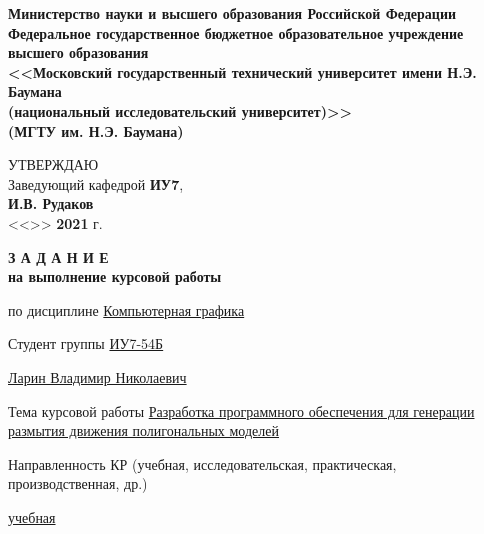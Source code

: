 \thispagestyle{empty}
\begin{center}
    \fontsize{11pt}{0.3\baselineskip}\selectfont \textbf{Министерство науки и высшего образования Российской Федерации \\ Федеральное государственное бюджетное образовательное учреждение \\ высшего образования \\ <<Московский государственный технический университет имени Н.Э. Баумана \\ (национальный исследовательский университет)>> \\ (МГТУ им. Н.Э. Баумана)}
    \makebox[\linewidth]{\rule{\textwidth}{3pt}}
    \begin{flushright}
        \fontsize{11pt}{0.5\baselineskip}\selectfont
            УТВЕРЖДАЮ \\ Заведующий кафедрой \textbf{ИУ7}, \\
            \uline{\mbox{\hspace*{2cm}}}
            \textbf{И.В. Рудаков} \\
            <<\uline{\mbox{\hspace*{1cm}}}>>
            \uline{\mbox{\hspace*{2.5cm}}}
            \textbf{2021} г.
    \end{flushright}
\end{center}


\begin{center}
    \fontsize{18pt}{0.6\baselineskip}\selectfont \textbf{З А Д А Н И Е}\\
    \fontsize{16pt}{0.6\baselineskip}\selectfont \textbf{на выполнение курсовой работы}
\end{center}

\normalsize

\begingroup
\fontsize{12pt}{0.5\baselineskip}\selectfont
\setlength{\parskip}{0.1em}
\setlength{\parindent}{0em}
по дисциплине \uline{\hfill Компьютерная графика \hfill}

Студент группы \uline{\hfill ИУ7-54Б \hfill}

\uline{\hfill Ларин Владимир Николаевич \hfill}

Тема курсовой работы \uline{Разработка   программного   обеспечения   для генерации размытия движения полигональных моделей \hfill}

Направленность КР (учебная, исследовательская, практическая, производственная, др.)

\uline{\hfill учебная \hfill}

